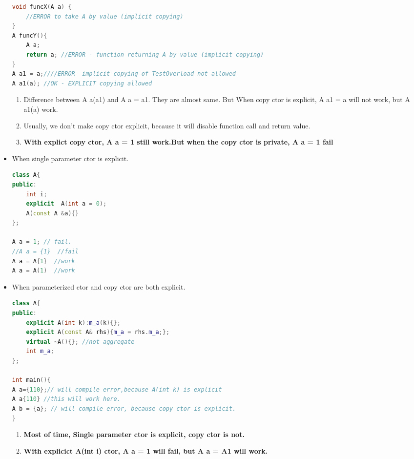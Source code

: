 \documentclass[a4paper,12pt,twoside]{book}
\begin{document}
\begin{itemize}
\begin{lstlisting}[frame=single, language=c++]
void funcX(A a) {
	//ERROR to take A by value (implicit copying)	
}
A funcY(){ 
	A a;
	return a; //ERROR - function returning A by value (implicit copying)
}
A a1 = a;////ERROR  implicit copying of TestOverload not allowed
A a1(a); //OK - EXPLICIT copying allowed
\end{lstlisting}
	
	\begin{enumerate}
		\item Difference between A a(a1) and A a = a1.  They are almost same. But When copy ctor is explicit,  A a1 = a will not work, but A a1(a) work.
		
		\item Usually, we don't make copy ctor explicit, because it will disable function call and return value.
		
		\item \textbf{With explict copy ctor, A a = 1 still work.But when the copy ctor is private, A a = 1 fail}

	\end{enumerate}

\item  When single parameter ctor is explicit.
\begin{lstlisting}[frame=single, language=c++]
class A{
public:
	int i;
	explicit  A(int a = 0);
	A(const A &a){} 
};

A a = 1; // fail. 
//A a = {1}  //fail
A a = A{1}  //work
A a = A(1)  //work
\end{lstlisting}

\item When parameterized ctor and copy ctor are both explicit.
\begin{lstlisting}[frame=single, language=c++]
class A{
public:
	explicit A(int k):m_a(k){};
	explicit A(const A& rhs){m_a = rhs.m_a;};
	virtual ~A(){}; //not aggregate
	int m_a;
};

int main(){
A a={110};// will compile error,because A(int k) is explicit
A a{110} //this will work here.
A b = {a}; // will compile error, because copy ctor is explicit.
}
\end{lstlisting}

\begin{enumerate}
	\item  \textbf{Most of time, Single parameter ctor is explicit, copy ctor is not.}
	\item \textbf{With explicict A(int i) ctor, A a = 1 will fail, but A a = A{1} will work.} 
\end{enumerate}


\end{itemize}
\end{document}
